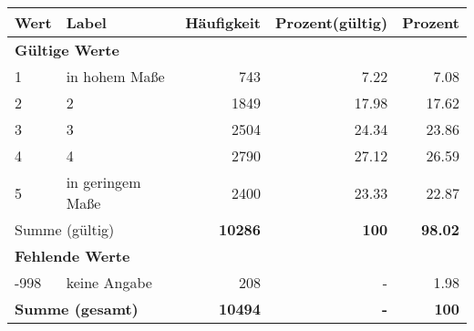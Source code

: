      \begin{longtable}{lXrrr}
     \toprule
     \textbf{Wert} & \textbf{Label} & \textbf{Häufigkeit} & \textbf{Prozent(gültig)} & \textbf{Prozent} \\
     \endhead
     \midrule
     \multicolumn{5}{l}{\textbf{Gültige Werte}}\\

     1 &
     \multicolumn{1}{X}{ in hohem Maße   } &


       \num{743} &
       \num[round-mode=places,round-precision=2]{7.22} &
         \num[round-mode=places,round-precision=2]{7.08} \\

     2 &
     \multicolumn{1}{X}{ 2   } &


       \num{1849} &
       \num[round-mode=places,round-precision=2]{17.98} &
         \num[round-mode=places,round-precision=2]{17.62} \\

     3 &
     \multicolumn{1}{X}{ 3   } &


       \num{2504} &
       \num[round-mode=places,round-precision=2]{24.34} &
         \num[round-mode=places,round-precision=2]{23.86} \\

     4 &
     \multicolumn{1}{X}{ 4   } &


       \num{2790} &
       \num[round-mode=places,round-precision=2]{27.12} &
         \num[round-mode=places,round-precision=2]{26.59} \\

     5 &
     \multicolumn{1}{X}{ in geringem Maße   } &


       \num{2400} &
       \num[round-mode=places,round-precision=2]{23.33} &
         \num[round-mode=places,round-precision=2]{22.87} \\
     \midrule
     \multicolumn{2}{l}{Summe (gültig)} &
       \textbf{\num{10286}} &
     \textbf{\num{100}} &
       \textbf{\num[round-mode=places,round-precision=2]{98.02}} \\
     \multicolumn{5}{l}{\textbf{Fehlende Werte}}\\
       -998 &
       keine Angabe &
         \num{208} &
        - &
         \num[round-mode=places,round-precision=2]{1.98} \\
     \midrule
     \multicolumn{2}{l}{\textbf{Summe (gesamt)}} &
          \textbf{\num{10494}} &
        \textbf{-} &
        \textbf{\num{100}} \\
     \bottomrule
     \end{longtable}
     
